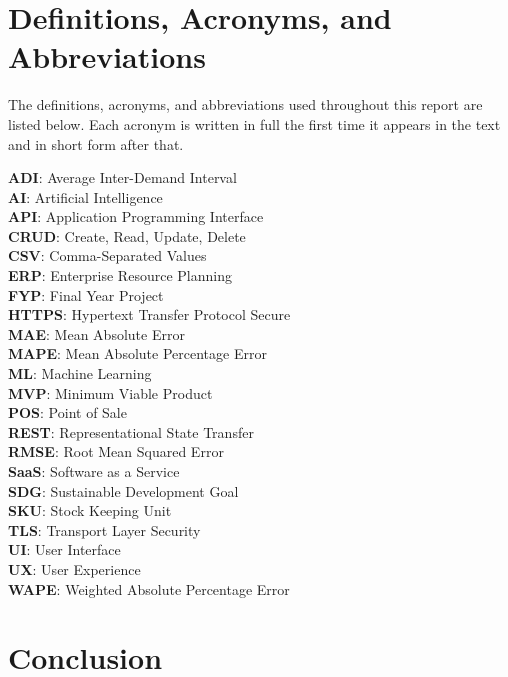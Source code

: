 \documentclass{StockSense}
\begin{document}
\section{Definitions, Acronyms, and Abbreviations}
\label{sec:definitions}

The definitions, acronyms, and abbreviations used throughout this report are listed below. Each acronym is written in full the first time it appears in the text and in short form after that.

\textbf{ADI}: Average Inter-Demand Interval\\
\textbf{AI}: Artificial Intelligence\\
\textbf{API}: Application Programming Interface\\
\textbf{CRUD}: Create, Read, Update, Delete\\
\textbf{CSV}: Comma-Separated Values\\
\textbf{ERP}: Enterprise Resource Planning\\
\textbf{FYP}: Final Year Project\\
\textbf{HTTPS}: Hypertext Transfer Protocol Secure\\
\textbf{MAE}: Mean Absolute Error\\
\textbf{MAPE}: Mean Absolute Percentage Error\\
\textbf{ML}: Machine Learning\\
\textbf{MVP}: Minimum Viable Product\\
\textbf{POS}: Point of Sale\\
\textbf{REST}: Representational State Transfer\\
\textbf{RMSE}: Root Mean Squared Error\\
\textbf{SaaS}: Software as a Service\\
\textbf{SDG}: Sustainable Development Goal\\
\textbf{SKU}: Stock Keeping Unit\\
\textbf{TLS}: Transport Layer Security\\
\textbf{UI}: User Interface\\
\textbf{UX}: User Experience\\
\textbf{WAPE}: Weighted Absolute Percentage Error

\section{Conclusion}
\end{document}
